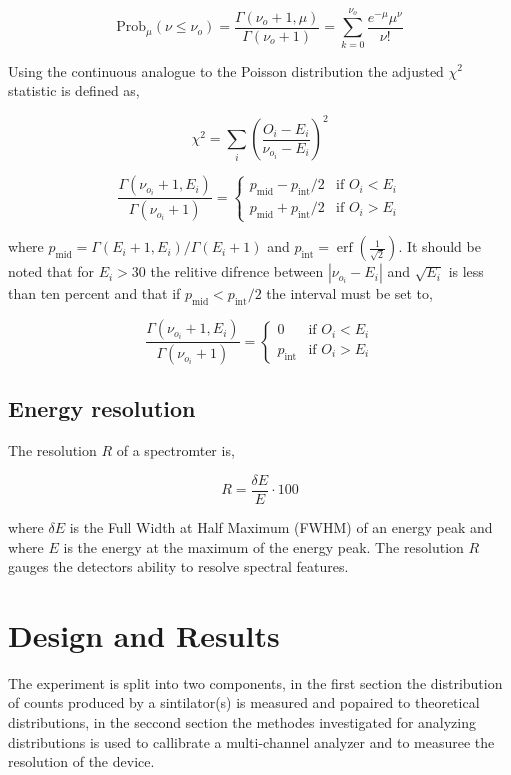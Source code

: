 \documentclass[%
 reprint,
 amsmath,amssymb,
 aps,
]{revtex4-1}
\begin{document}
\[
\text{Prob}_\mu\left(\nu \leq \nu_o\right)=\frac{\Gamma(\nu_o+1, \mu)}{\Gamma(\nu_o + 1)}=\sum_{k=0}^{\nu_o}\frac{e^{-\mu}\mu^\nu}{\nu!}
\]

Using the continuous analogue to the Poisson distribution the adjusted $\chi^2$ statistic is defined as,

\[
\chi^2 = \sum_i \left(\frac{O_i - E_i}{\nu_{o_i} - E_i}\right)^2
\]

\[
\frac{\Gamma(\nu_{o_i}+1, E_i)}{\Gamma(\nu_{o_i} + 1)} = \begin{cases}
p_\text{mid} - p_\text{int}/2 & \text{if $O_i < E_i$}\\
p_\text{mid} + p_\text{int}/2 & \text{if $O_i > E_i$}
\end{cases}
\]

where $p_\text{mid} = \Gamma(E_i+1, E_i)/\Gamma(E_i + 1)$ and $p_\text{int}=\operatorname{erf}({\frac{1}{\sqrt{2}}})$. It should be noted that for $E_i > 30$ the relitive difrence between $\left|\nu_{o_i}-E_i\right|$ and $\sqrt{E_i}$ is less than ten percent and that if $p_\text{mid} < p_\text{int}/2$ the interval must be set to,

\[
\frac{\Gamma(\nu_{o_i}+1, E_i)}{\Gamma(\nu_{o_i} + 1)} = \begin{cases}
0 & \text{if $O_i < E_i$}\\
p_\text{int} & \text{if $O_i > E_i$}
\end{cases}
\]

\subsection{Energy resolution}
The resolution $R$ of a spectromter is,

\begin{equation}
R = \frac{\delta E}{E}\cdot100
\label{energy_resolution}
\end{equation}

where $\delta E$ is the Full Width at Half Maximum (FWHM) of an energy peak and where $E$ is the energy at the maximum of the energy peak. The resolution $R$ gauges the detectors ability to resolve spectral features.

\section{Design and Results}
The experiment is split into two components, in the first section the distribution of counts produced by a sintilator(s) is measured and popaired to theoretical distributions, in the seccond section the methodes investigated for analyzing distributions is used to callibrate a multi-channel analyzer and  to measuree the resolution of the device.
\end{document}
